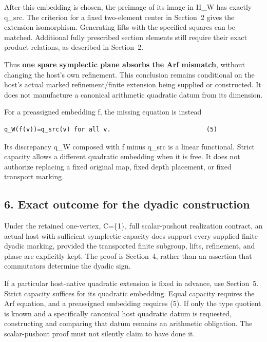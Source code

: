 After this embedding is chosen, the preimage of its image in H\_W has
exactly q\_src. The criterion for a fixed two-element center in Section~2 gives
the extension isomorphism. Generating lifts with the specified squares
can be matched. Additional fully prescribed section elements still
require their exact product relations, as described in Section~2.

Thus \textbf{one spare symplectic plane absorbs the Arf mismatch},
without changing the host's own refinement. This conclusion remains
conditional on the host's actual marked refinement/finite extension
being supplied or constructed. It does not manufacture a canonical
arithmetic quadratic datum from its dimension.

For a preassigned embedding f, the missing equation is instead

\begin{Verbatim}[fontsize=\small,breaklines=true,breakanywhere=true]
q_W(f(v))=q_src(v) for all v.                          (5)
\end{Verbatim}

Its discrepancy q\_W composed with f minus q\_src is a linear
functional. Strict capacity allows a different quadratic embedding when it is free. It does not authorize replacing a fixed original map, fixed
depth placement, or fixed transport marking.

\hypertarget{dyadic_markings-exact-outcome-for-the-dyadic-construction}{%
\subsection{6. Exact outcome for the dyadic
construction}\label{dyadic_markings-exact-outcome-for-the-dyadic-construction}}

Under the retained one-vertex, C=\{1\}, full scalar-pushout realization
contract, an actual host with sufficient symplectic capacity does
support every supplied finite dyadic marking, provided the transported
finite subgroup, lifts, refinement, and phase are explicitly kept. The
proof is Section~4, rather than an assertion that commutators determine
the dyadic sign.

If a particular host-native quadratic extension is fixed in advance, use
Section~5. Strict capacity suffices for its quadratic embedding. Equal capacity requires the Arf equation, and a preassigned embedding requires
(5). If only the type quotient is known and a specifically canonical
host quadratic datum is requested, constructing and comparing that datum
remains an arithmetic obligation. The scalar-pushout proof must not
silently claim to have done it.

